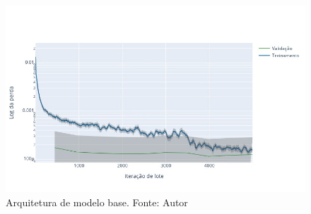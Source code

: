\begin{figure}[!ht]
    \centering
    \includegraphics[width=\columnwidth]{Imagens/results/rsp-swin-t_planet_pt/Training Loss Per Minibatch.jpg}
    \caption{ Arquitetura de modelo base. Fonte: Autor}
    \label{fig:LossTrainSwin}
\end{figure}
